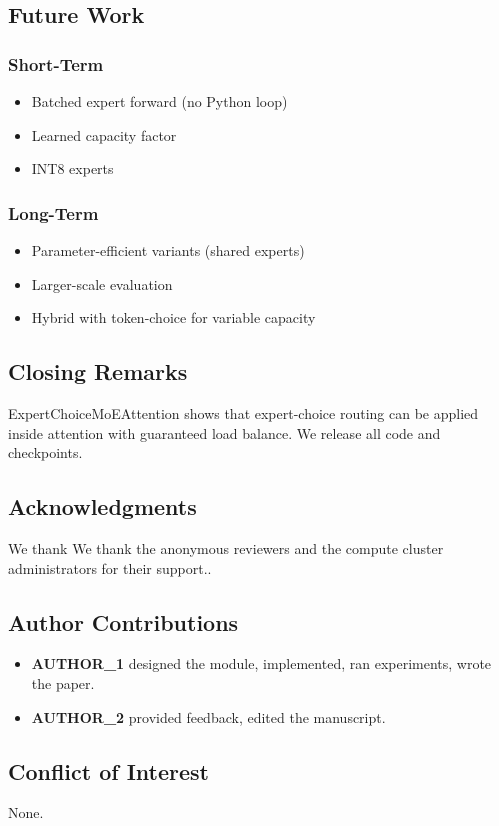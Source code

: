 \subsection{Future Work}

\subsubsection{Short-Term}
\begin{itemize}
\item Batched expert forward (no Python loop)
\item Learned capacity factor
\item INT8 experts

\end{itemize}
\subsubsection{Long-Term}
\begin{itemize}
\item Parameter-efficient variants (shared experts)
\item Larger-scale evaluation
\item Hybrid with token-choice for variable capacity

\end{itemize}
\subsection{Closing Remarks}

ExpertChoiceMoEAttention shows that expert-choice routing can be applied 
inside attention with guaranteed load balance. We release all code and 
checkpoints.

\subsection{Acknowledgments}

We thank We thank the anonymous reviewers and the compute cluster administrators for their support..

\subsection{Author Contributions}

\begin{itemize}
\item \textbf{{{AUTHOR\_1}}} designed the module, implemented, ran experiments, wrote
  the paper.
\item \textbf{{{AUTHOR\_2}}} provided feedback, edited the manuscript.

\end{itemize}
\subsection{Conflict of Interest}

None.

